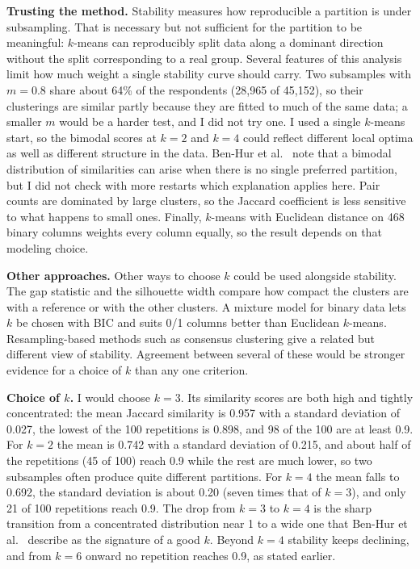 \documentclass[10pt,letterpaper]{article}
\begin{document}
\textbf{Trusting the method.} Stability measures how reproducible a partition is under subsampling. That is necessary but not sufficient for the partition to be meaningful: $k$-means can reproducibly split data along a dominant direction without the split corresponding to a real group. Several features of this analysis limit how much weight a single stability curve should carry. Two subsamples with $m=0.8$ share about 64\% of the respondents (28,965 of 45,152), so their clusterings are similar partly because they are fitted to much of the same data; a smaller $m$ would be a harder test, and I did not try one. I used a single $k$-means start, so the bimodal scores at $k=2$ and $k=4$ could reflect different local optima as well as different structure in the data. Ben-Hur et al.\ \cite{benhur2002} note that a bimodal distribution of similarities can arise when there is no single preferred partition, but I did not check with more restarts which explanation applies here. Pair counts are dominated by large clusters, so the Jaccard coefficient is less sensitive to what happens to small ones. Finally, $k$-means with Euclidean distance on 468 binary columns weights every column equally, so the result depends on that modeling choice.

\textbf{Other approaches.} Other ways to choose $k$ could be used alongside stability. The gap statistic and the silhouette width compare how compact the clusters are with a reference or with the other clusters. A mixture model for binary data lets $k$ be chosen with BIC and suits 0/1 columns better than Euclidean $k$-means. Resampling-based methods such as consensus clustering give a related but different view of stability. Agreement between several of these would be stronger evidence for a choice of $k$ than any one criterion.


\textbf{Choice of $k$.} I would choose $k=3$. Its similarity scores are both high and tightly concentrated: the mean Jaccard similarity is 0.957 with a standard deviation of 0.027, the lowest of the 100 repetitions is 0.898, and 98 of the 100 are at least 0.9. For $k=2$ the mean is 0.742 with a standard deviation of 0.215, and about half of the repetitions (45 of 100) reach 0.9 while the rest are much lower, so two subsamples often produce quite different partitions. For $k=4$ the mean falls to 0.692, the standard deviation is about 0.20 (seven times that of $k=3$), and only 21 of 100 repetitions reach 0.9. The drop from $k=3$ to $k=4$ is the sharp transition from a concentrated distribution near 1 to a wide one that Ben-Hur et al.\ \cite{benhur2002} describe as the signature of a good $k$. Beyond $k=4$ stability keeps declining, and from $k=6$ onward no repetition reaches 0.9, as stated earlier.
\end{document}
